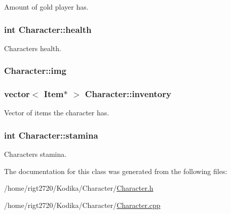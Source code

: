 Amount of gold player has. 

\hypertarget{classCharacter_a69c649b8febd22729e6edafb27e69aeb}{
\subsubsection[{health}]{\setlength{\rightskip}{0pt plus 5cm}int Character\-::health\hspace{0.3cm}{\ttfamily [protected]}}}\label{classCharacter_a69c649b8febd22729e6edafb27e69aeb}


Characters health. 

\hypertarget{classCharacter_a3a0a90b2a43858b259912f659b8e0eea}{
\subsubsection[{img}]{ Character\-::img\hspace{0.3cm}{\ttfamily [protected]}}}\label{classCharacter_a3a0a90b2a43858b259912f659b8e0eea}
\hypertarget{classCharacter_a27634c9cfd5a0cac96864b08b926c8a8}{
\subsubsection[{inventory}]{\setlength{\rightskip}{0pt plus 5cm}vector$<$ {\bf Item}$\ast$ $>$ Character\-::inventory\hspace{0.3cm}{\ttfamily [protected]}}}\label{classCharacter_a27634c9cfd5a0cac96864b08b926c8a8}


Vector of items the character has. 

\hypertarget{classCharacter_a0f17daa14530e07f0ca479c2dd97f38b}{
\subsubsection[{stamina}]{\setlength{\rightskip}{0pt plus 5cm}int Character\-::stamina\hspace{0.3cm}{\ttfamily [protected]}}}\label{classCharacter_a0f17daa14530e07f0ca479c2dd97f38b}


Characters stamina. 



The documentation for this class was generated from the following files\-:\begin{DoxyCompactItemize}
\item 
/home/rigt2720/\-Kodika/\-Character/\hyperlink{Character_8h}{Character.\-h}\item 
/home/rigt2720/\-Kodika/\-Character/\hyperlink{Character_8cpp}{Character.\-cpp}\end{DoxyCompactItemize}

